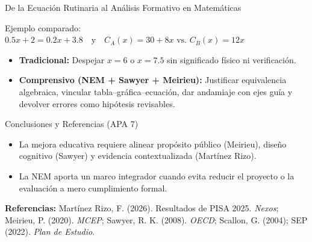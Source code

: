 \documentclass[aspectratio=169,spanish,xcolor=table]{beamer}
\begin{document}
\begin{frame}{De la Ecuación Rutinaria al Análisis Formativo en Matemáticas}
  \begin{block}{Ejemplo comparado: $0.5x + 2 = 0.2x + 3.8 \quad\text{y}\quad C_A(x)=30+8x \text{ vs. } C_B(x)=12x$}
    \begin{itemize}\normalsize
      \item \textbf{Tradicional:} Despejar $x=6$ o $x=7.5$ sin significado físico ni verificación.
      \item \textbf{Comprensivo (NEM + Sawyer + Meirieu):} Justificar equivalencia algebraica, vincular tabla--gráfica--ecuación, dar andamiaje con ejes guía y devolver errores como hipótesis revisables.
    \end{itemize}
  \end{block}
\end{frame}

\begin{frame}{Conclusiones y Referencias (APA 7)}
  \begin{itemize}\small
    \item La mejora educativa requiere alinear propósito público (Meirieu), diseño cognitivo (Sawyer) y evidencia contextualizada (Martínez Rizo).
    \item La NEM aporta un marco integrador cuando evita reducir el proyecto o la evaluación a mero cumplimiento formal.
  \end{itemize}
  \vspace{0.3cm}
  \scriptsize
  \textbf{Referencias:} Martínez Rizo, F. (2026). Resultados de PISA 2025. \textit{Nexos}; Meirieu, P. (2020). \textit{MCEP}; Sawyer, R. K. (2008). \textit{OECD}; Scallon, G. (2004); SEP (2022). \textit{Plan de Estudio}.
\end{frame}
\end{document}
